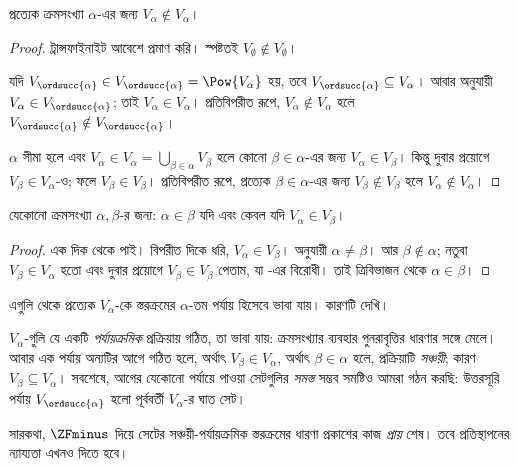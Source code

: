 \documentclass[../../../include/open-logic-section]{subfiles}
\begin{document}
\begin{lem}
প্রত্যেক ক্রমসংখ্যা $\alpha$-এর জন্য
$V_\alpha \notin V_\alpha$।
\end{lem}

\begin{proof}
ট্রান্সফাইনাইট আবেশে প্রমাণ করি। স্পষ্টতই
$V_\emptyset \notin V_\emptyset$।

যদি $V_{\ordsucc{\alpha}} \in V_{\ordsucc{\alpha}} = \Pow{V_\alpha}$
হয়, তবে $V_{\ordsucc{\alpha}} \subseteq V_\alpha$।
আবার  অনুযায়ী
$V_\alpha \in V_{\ordsucc{\alpha}}$; তাই
$V_\alpha \in V_\alpha$। প্রতিবিপরীত রূপে,
$V_\alpha \notin V_\alpha$ হলে
$V_{\ordsucc{\alpha}} \notin V_{\ordsucc{\alpha}}$।

$\alpha$ সীমা হলে এবং $V_\alpha \in V_\alpha = \bigcup_{\beta \in
\alpha}V_\beta$ হলে কোনো $\beta \in
\alpha$-এর জন্য $V_\alpha \in V_\beta$।
কিন্তু  দুবার
প্রয়োগে $V_\beta \in V_\alpha$-ও; ফলে
$V_\beta \in V_\beta$। প্রতিবিপরীত রূপে,
প্রত্যেক $\beta \in \alpha$-এর জন্য
$V_\beta \notin V_\beta$ হলে
$V_\alpha \notin
V_\alpha$।
\end{proof}

\begin{cor}
যেকোনো ক্রমসংখ্যা $\alpha, \beta$-র জন্য:
$\alpha \in \beta$ যদি এবং কেবল যদি
$V_\alpha \in V_\beta$।
\end{cor}

\begin{proof}
এক দিক  থেকে পাই।
বিপরীত দিকে ধরি, $V_\alpha \in V_\beta$।
 অনুযায়ী
$\alpha \neq \beta$। আর $\beta \notin \alpha$;
নতুবা $V_\beta \in V_\alpha$ হতো এবং
 দুবার প্রয়োগে
$V_\beta \in V_\beta$ পেতাম,
যা -এর বিরোধী।
তাই ত্রিবিভাজন থেকে $\alpha \in \beta$।
\end{proof}
\noindent
এগুলি থেকে প্রত্যেক $V_\alpha$-কে স্তরক্রমের
$\alpha$-তম পর্যায় হিসেবে ভাবা যায়। কারণটি দেখি।

$V_\alpha$-গুলি যে একটি \emph{পর্যায়ক্রমিক}
প্রক্রিয়ায় গঠিত, তা ভাবা যায়: ক্রমসংখ্যার
ব্যবহার পুনরাবৃত্তির ধারণার সঙ্গে মেলে। আবার
এক পর্যায় অন্যটির আগে গঠিত হলে, অর্থাৎ
$V_\beta \in V_\alpha$, অর্থাৎ $\beta \in \alpha$
হলে, প্রক্রিয়াটি \emph{সঞ্চয়ী}; কারণ
$V_\beta \subseteq V_\alpha$। সবশেষে, আগের
যেকোনো পর্যায়ে পাওয়া সেটগুলির \emph{সমস্ত}
সম্ভব সমষ্টিও আমরা গঠন করছি: উত্তরসূরি পর্যায়
$V_{\ordsucc{\alpha}}$ হলো পূর্ববর্তী
$V_\alpha$-র ঘাত সেট।

সারকথা, $\ZFminus$ দিয়ে সেটের সঞ্চয়ী-পর্যায়ক্রমিক
স্তরক্রমের ধারণা প্রকাশের কাজ \emph{প্রায়}
শেষ। তবে প্রতিস্থাপনের ন্যায্যতা এখনও দিতে হবে।
\end{document}
